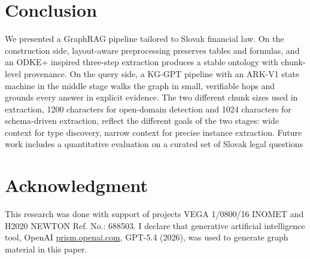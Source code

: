 \documentclass[conference]{IEEEtran}
\begin{document}
\section{Conclusion}

We presented a GraphRAG pipeline tailored to Slovak financial law. On the construction side, layout-aware preprocessing preserves tables and formulas, and an ODKE+ inspired three-step extraction produces a stable ontology with chunk-level provenance. On the query side, a KG-GPT pipeline with an ARK-V1 state machine in the middle stage walks the graph in small, verifiable hops and grounds every answer in explicit evidence. The two different chunk sizes used in extraction, 1200 characters for open-domain detection and 1024 characters for schema-driven extraction, reflect the different goals of the two stages: wide context for type discovery, narrow context for precise instance extraction. Future work includes a quantitative evaluation on a curated set of Slovak legal questions


\section*{Acknowledgment}

This research was done with support of projects VEGA 1/0800/16 INOMET and H2020 NEWTON Ref. No.: 688503. I declare that generative artificial intelligence tool, OpenAI \url{prism.openai.com}, GPT-5.4 (2026), was used to generate graph material in this paper. 
\end{document}
